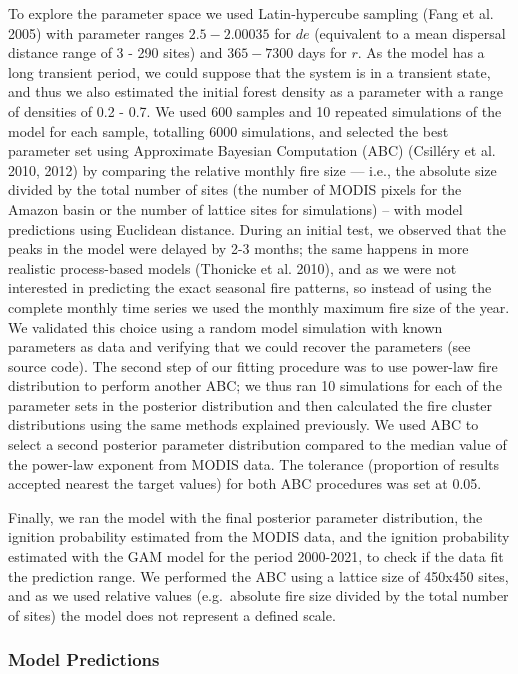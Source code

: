 \documentclass[
]{article}
\begin{document}
To explore the parameter space we used Latin-hypercube sampling (Fang et
al. 2005) with parameter ranges \(2.5 - 2.00035\) for \(de\) (equivalent
to a mean dispersal distance range of 3 - 290 sites) and \(365 - 7300\)
days for \(r\). As the model has a long transient period, we could
suppose that the system is in a transient state, and thus we also
estimated the initial forest density as a parameter with a range of
densities of 0.2 - 0.7. We used 600 samples and 10 repeated simulations
of the model for each sample, totalling 6000 simulations, and selected
the best parameter set using Approximate Bayesian Computation (ABC)
(Csilléry et al. 2010, 2012) by comparing the relative monthly fire size
--- i.e., the absolute size divided by the total number of sites (the
number of MODIS pixels for the Amazon basin or the number of lattice
sites for simulations) -- with model predictions using Euclidean
distance. During an initial test, we observed that the peaks in the
model were delayed by 2-3 months; the same happens in more realistic
process-based models (Thonicke et al. 2010), and as we were not
interested in predicting the exact seasonal fire patterns, so instead of
using the complete monthly time series we used the monthly maximum fire
size of the year. We validated this choice using a random model
simulation with known parameters as data and verifying that we could
recover the parameters (see source code). The second step of our fitting
procedure was to use power-law fire distribution to perform another ABC;
we thus ran 10 simulations for each of the parameter sets in the
posterior distribution and then calculated the fire cluster
distributions using the same methods explained previously. We used ABC
to select a second posterior parameter distribution compared to the
median value of the power-law exponent from MODIS data. The tolerance
(proportion of results accepted nearest the target values) for both ABC
procedures was set at 0.05.

Finally, we ran the model with the final posterior parameter
distribution, the ignition probability estimated from the MODIS data,
and the ignition probability estimated with the GAM model for the period
2000-2021, to check if the data fit the prediction range. We performed
the ABC using a lattice size of 450x450 sites, and as we used relative
values (e.g.~absolute fire size divided by the total number of sites)
the model does not represent a defined scale.

\subsubsection{Model Predictions}\label{model-predictions}
\end{document}
